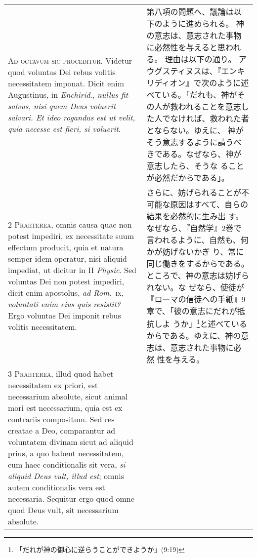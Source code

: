 \documentclass[10pt]{jsarticle} %
\begin{document}
\begin{longtable}{p{21em}p{21em}}


{\huge A}{\scshape d octavum sic proceditur}. Videtur quod
voluntas Dei rebus volitis necessitatem imponat. Dicit enim Augustinus,
in {\itshape Enchirid}., {\itshape nullus fit salvus, nisi quem Deus voluerit salvari. Et
ideo rogandus est ut velit, quia necesse est fieri, si voluerit}.

&

第八項の問題へ、議論は以下のように進められる。
神の意志は、意志された事物に必然性を与えると思われる。
理由は以下の通り。
アウグスティヌスは、『エンキリディオン』で次のように述べている。「だれも、神がそ
 の人が救われることを意志した人でなければ、救われた者とならない。ゆえに、
 神がそう意志するように請うべきである。なぜなら、神が意志したら、そうな
 ることが必然だからである」。


\\


{\scshape 2 Praeterea}, omnis causa quae non potest
impediri, ex necessitate suum effectum producit, quia et natura semper
idem operatur, nisi aliquid impediat, ut dicitur in II {\itshape Physic}. Sed
voluntas Dei non potest impediri, dicit enim apostolus, {\itshape ad Rom}.~{\scshape ix},
{\itshape voluntati enim eius quis resistit?} Ergo voluntas Dei imponit rebus
volitis necessitatem.


&

さらに、妨げられることが不可能な原因はすべて、自らの結果を必然的に生み出
 す。なぜなら、『自然学』2巻で言われるように、自然も、何かが妨げないかぎ
 り、常に同じ働きをするからである。ところで、神の意志は妨げられない。な
 ぜなら、使徒が『ローマの信徒への手紙』9章で、「彼の意志にだれが抵抗しよ
 うか」\footnote{「だれが神の御心に逆らうことができようか」(9:19)}と述べているからである。ゆえに、神の意志は、意志された事物に必然
 性を与える。


\\


{\scshape 3 Praeterea}, illud quod habet necessitatem ex
priori, est necessarium absolute, sicut animal mori est necessarium,
quia est ex contrariis compositum. Sed res creatae a Deo, comparantur ad
voluntatem divinam sicut ad aliquid prius, a quo habent necessitatem,
cum haec conditionalis sit vera, {\itshape si aliquid Deus vult, illud est}; omnis
autem conditionalis vera est necessaria. Sequitur ergo quod omne quod
Deus vult, sit necessarium absolute.


&


\end{longtable}
\end{document}
